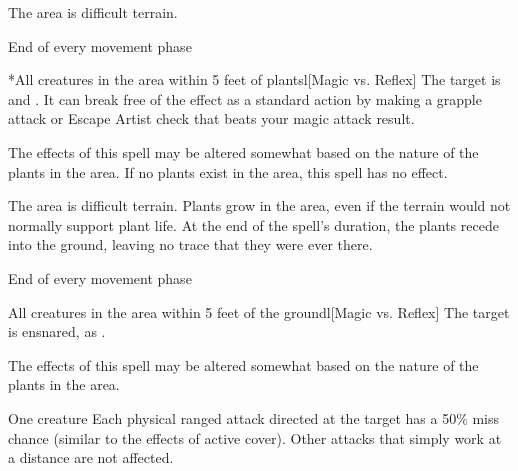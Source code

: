 \spelldur{\durshort \dismissable}
\spellline
\spelleffect The area is difficult terrain.
\begin{spelltrigger}{End of every movement phase}
    \begin{spelltarget}*{All creatures in the area within 5 feet of plants}l[Magic vs. Reflex]
        \spellsuccess The target is \entangled and \immobilized. It can break free of the effect as a standard action by making a grapple attack or Escape Artist check that beats your magic attack result.
    \end{spelltarget}
\end{spelltrigger}
\spellnotes The effects of this spell may be altered somewhat based on the nature of the plants in the area. If no plants exist in the area, this spell has no effect.

\spelldur{\durshort \dismissable}
\spellline
\spelleffect The area is difficult terrain. Plants grow in the area, even if the terrain would not normally support plant life. At the end of the spell's duration, the plants recede into the ground, leaving no trace that they were ever there.
\begin{spelltrigger}{End of every movement phase}
    \begin{spelltarget}{All creatures in the area within 5 feet of the ground}l[Magic vs. Reflex]
        \spellsuccess The target is ensnared, as .
    \end{spelltarget}
\end{spelltrigger}
\spellnotes The effects of this spell may be altered somewhat based on the nature of the plants in the area.

\spelldur{\durshort \dismissable}
\begin{spelltarget}{One creature}
    \spelleffect Each physical ranged attack directed at the target has a 50\% miss chance (similar to the effects of active cover). Other attacks that simply work at a distance are not affected.
\end{spelltarget}

